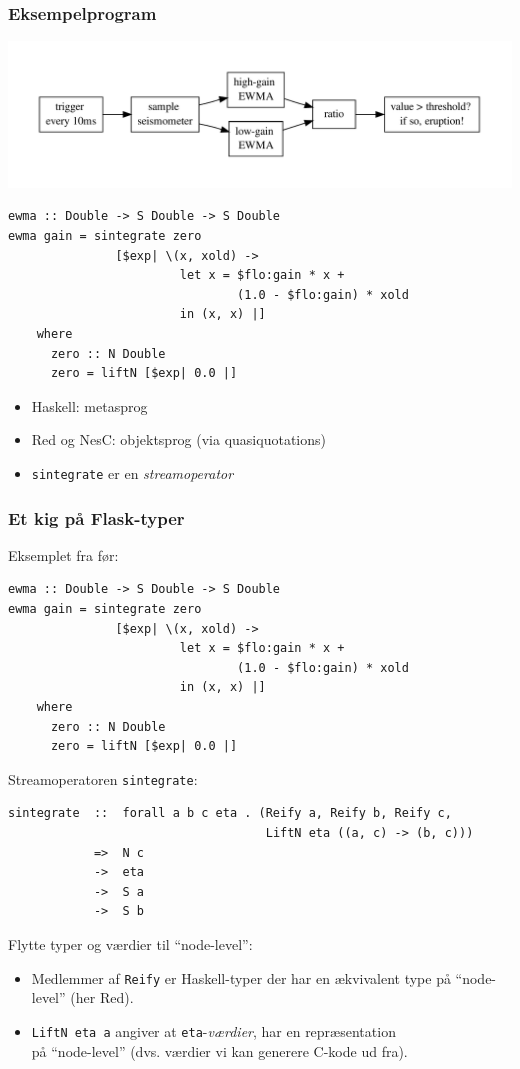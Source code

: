 \documentclass{beamer}
\begin{document}
\begin{frame}[t, fragile]
  \frametitle{Eksempelprogram} 

  \includegraphics[width=\textwidth]{flask-ewma}
  \pause
\tiny

\begin{verbatim}
ewma :: Double -> S Double -> S Double
ewma gain = sintegrate zero
               [$exp| \(x, xold) ->
                        let x = $flo:gain * x +
                                (1.0 - $flo:gain) * xold
                        in (x, x) |]
    where
      zero :: N Double
      zero = liftN [$exp| 0.0 |]
\end{verbatim}

\pause
\normalsize
\begin{itemize}
\item 
  Haskell: metasprog
\item 
  Red og NesC: objektsprog (via quasiquotations)
\item 
  \verb|sintegrate| er en \textit{streamoperator}
\end{itemize}

\end{frame}

\begin{frame}[t, fragile]
  \frametitle{Et kig på Flask-typer}
Eksemplet fra før:
  \tiny
\begin{verbatim}
ewma :: Double -> S Double -> S Double
ewma gain = sintegrate zero
               [$exp| \(x, xold) ->
                        let x = $flo:gain * x +
                                (1.0 - $flo:gain) * xold
                        in (x, x) |]
    where
      zero :: N Double
      zero = liftN [$exp| 0.0 |]
\end{verbatim}
\normalsize
\pause

Streamoperatoren \verb|sintegrate|:
\tiny
\begin{verbatim}
sintegrate  ::  forall a b c eta . (Reify a, Reify b, Reify c,
                                    LiftN eta ((a, c) -> (b, c)))
            =>  N c
            ->  eta
            ->  S a
            ->  S b
\end{verbatim}
\normalsize

\pause
Flytte typer og værdier til ``node-level'':

\begin{itemize}
\item Medlemmer af \verb|Reify| er Haskell-typer der har en ækvivalent
  type på ``node-level'' (her Red). 
\pause
\item \verb|LiftN eta a| angiver at \verb|eta|-\textit{værdier}, har en
  repræsentation \\ på ``node-level'' (dvs. værdier vi kan generere
  C-kode ud fra).
\end{itemize}

\end{frame}
\end{document}
